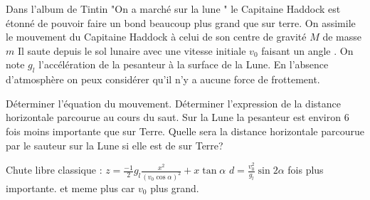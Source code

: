 \begin{Exercise}[title=Bond sur la Lune]
	Dans l'album de Tintin "On a marché sur la lune " le Capitaine Haddock est étonné de pouvoir faire un bond beaucoup plus grand que sur terre.
	On assimile le mouvement du Capitaine Haddock à celui de son centre de
    gravité $M$ de masse $m$ Il saute depuis le sol lunaire avec une vitesse
    initiale $v_0$ faisant un angle . On note $g_l$
    l'accélération de la pesanteur à la surface de la Lune. En l'absence
    d'atmosphère on peux considérer qu'il n'y a aucune force de frottement.

	\Question Déterminer l'équation du mouvement.
	\Question Déterminer l'expression de la distance horizontale parcourue au cours du saut.
	\Question Sur la Lune la pesanteur est environ 6 fois moins importante que
    sur Terre. Quelle sera la distance horizontale parcourue par le sauteur sur
    la Lune si elle est de  sur Terre?

\end{Exercise}
\begin{Answer}
	\Question Chute libre classique : $z= \frac{-1}{2}g_l\frac{x^2}{(v_0\cos \alpha)^2}+x\tan\alpha$
	\Question $d=\frac{v_0^2}{g_l}\sin 2\alpha$
	 fois plus importante. et meme plus car $v_0$ plus grand.
\end{Answer}
